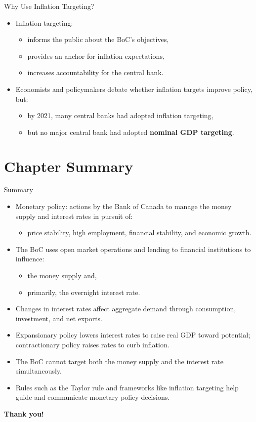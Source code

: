 \documentclass[aspectratio=169]{beamer}
\begin{document}
\begin{frame}{Why Use Inflation Targeting?}
\transfade
\begin{itemize}
  \item Inflation targeting:
  \begin{itemize}
    \item informs the public about the BoC’s objectives,
    \item provides an \alert{anchor} for inflation expectations,
    \item increases accountability for the central bank.
  \end{itemize}
  \item Economists and policymakers debate whether inflation targets improve policy, but:
  \begin{itemize}
    \item by 2021, many central banks had adopted inflation targeting,
    \item but no major central bank had adopted \textbf{nominal GDP targeting}.
  \end{itemize}
\end{itemize}
\end{frame}

\section*{Chapter Summary}

\begin{frame}{Summary}
\transfade
\begin{itemize}
  \item Monetary policy: actions by the Bank of Canada to manage the money supply and interest rates in pursuit of:
  \begin{itemize}
    \item price stability, high employment, financial stability, and economic growth.
  \end{itemize}
  \item The BoC uses open market operations and lending to financial institutions to influence:
  \begin{itemize}
    \item the money supply and,
    \item primarily, the overnight interest rate.
  \end{itemize}
  \item Changes in interest rates affect aggregate demand through consumption, investment, and net exports.
  \item Expansionary policy lowers interest rates to raise real GDP toward potential; contractionary policy raises rates to curb inflation.
  \item The BoC cannot target both the money supply and the interest rate simultaneously.
  \item Rules such as the Taylor rule and frameworks like inflation targeting help guide and communicate monetary policy decisions.
\end{itemize}
\end{frame}

\begin{frame}
\centering
\Huge \textbf{Thank you!}
\end{frame}
\end{document}
